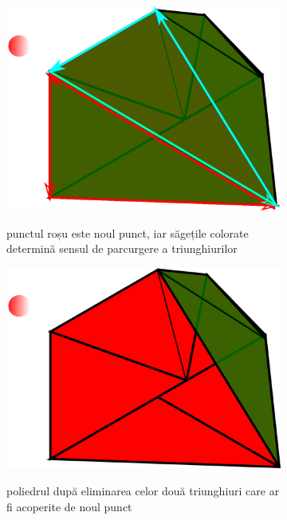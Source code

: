 \documentclass[12pt,a4paper]{report}
\begin{document}
\begin{figure}[H]
	\centering
	\begin{subfigure}[h]{0.32\textwidth}
		\includegraphics[width=\textwidth]{pics/EPA0.png}
		\label{fig:EPA0}
		\caption{punctul roșu este noul punct, iar săgețile colorate determină sensul de parcurgere a triunghiurilor}
		\vfill
	\end{subfigure}
	\hfill
	\begin{subfigure}[h]{0.32\textwidth}
		\includegraphics[width=\textwidth]{pics/EPA1.png}
		\label{fig:EPA1}
		\caption{poliedrul după eliminarea celor două triunghiuri care ar fi acoperite de noul punct}
		\vfill
	\end{subfigure}
 	\hfill
 	\begin{subfigure}[h]{0.32\textwidth}

\end{subfigure}
\end{figure}
\end{document}
